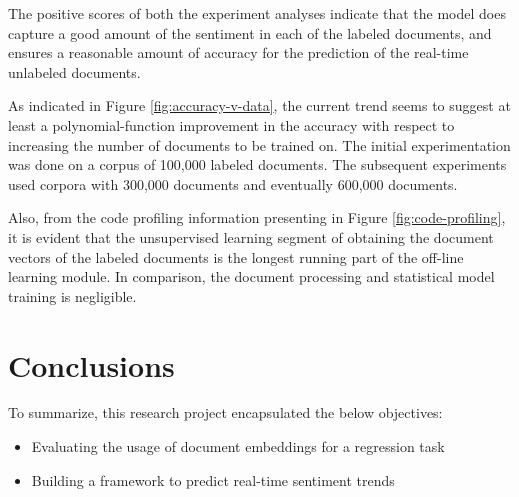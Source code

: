 \documentclass[conference]{IEEEtran}
\begin{document}
        \begin{table}[H] \caption{Evaluation results} \label{results}
            \centering
        \end{table}

        The positive scores of both the experiment analyses indicate that the model does capture a good amount of the sentiment in each of the labeled documents, and ensures a reasonable amount of accuracy for the prediction of the real-time unlabeled documents.

        As indicated in Figure \ref{fig:accuracy-v-data}, the current trend seems to suggest at least a polynomial-function improvement in the accuracy with respect to increasing the number of documents to be trained on. 
        The initial experimentation was done on a corpus of 100,000 labeled documents. 
        The subsequent experiments used corpora with 300,000 documents and eventually 600,000 documents.

        Also, from the code profiling information presenting in Figure \ref{fig:code-profiling}, it is evident that the unsupervised learning segment of obtaining the document vectors of the labeled documents is the longest running part of the off-line learning module. 
        In comparison, the document processing and statistical model training is negligible.

\vspace{5mm}

\section{Conclusions}
    To summarize, this research project encapsulated the below objectives:
    \begin{itemize}
        \item Evaluating the usage of document embeddings for a regression task
        \item Building a framework to predict real-time sentiment trends
    \end{itemize}
\end{document}
